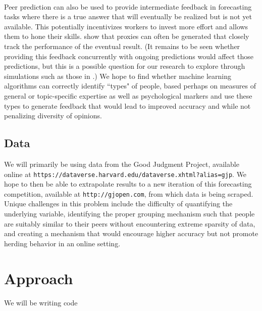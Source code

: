 \documentclass[a4paper, 11pt]{article}
\begin{document}
\paragraph{} Peer prediction can also be used to provide intermediate feedback in forecasting tasks where there is a true answer that will eventually be realized but is not yet available. This potentially incentivizes workers to invest more effort and allows them to hone their skills. \citet{witkowski2017proper} show that proxies can often be generated that closely track the performance of the eventual result. (It remains to be seen whether providing this feedback concurrently with ongoing predictions would affect those predictions, but this is a possible question for our research to explore through simulations such as those in \citet{shnayder2016measuring}.) We hope to find whether machine learning algorithms can correctly identify ``types" of people, based perhaps on measures of general or topic-specific expertise as well as psychological markers and use these types to generate feedback that would lead to improved accuracy and while not penalizing diversity of opinions. 
\subsection{Data}
We will primarily be using data from the Good Judgment Project, available online at  \texttt{https://dataverse.harvard.edu/dataverse.xhtml?alias=gjp}. We hope to then be able to extrapolate results to a new iteration of this forecasting competition, available at \texttt{http://gjopen.com}, from which data is being scraped. Unique challenges in this problem include the difficulty of quantifying the underlying variable, identifying the proper grouping mechanism such that people are suitably similar to their peers without encountering extreme sparsity of data, and creating a mechanism that would encourage higher accuracy but not promote herding behavior in an online setting.

\section{Approach}
We will be writing code 
\end{document}

